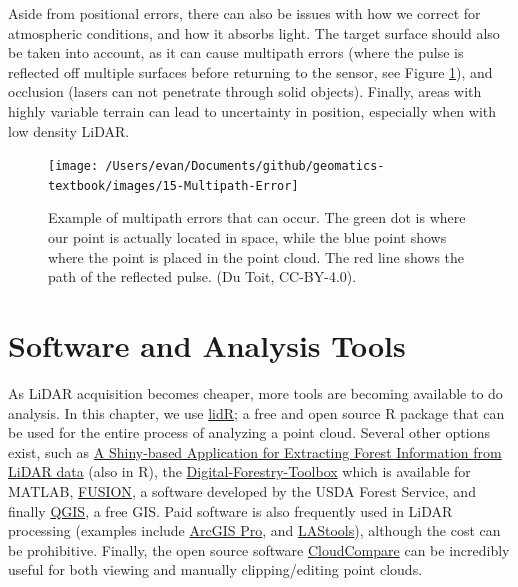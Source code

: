 \documentclass[
]{book}
\begin{document}
Aside from positional errors, there can also be issues with how we correct for atmospheric conditions, and how it absorbs light. The target surface should also be taken into account, as it can cause multipath errors (where the pulse is reflected off multiple surfaces before returning to the sensor, see Figure \ref{fig:15-multipath-error}), and occlusion (lasers can not penetrate through solid objects). Finally, areas with highly variable terrain can lead to uncertainty in position, especially when with low density LiDAR.

\begin{figure}
\texttt{[image: /Users/evan/Documents/github/geomatics-textbook/images/15-Multipath-Error]} \caption{Example of multipath errors that can occur. The green dot is where our point is actually located in space, while the blue point shows where the point is placed in the point cloud. The red line shows the path of the reflected pulse. (Du Toit, CC-BY-4.0).}\label{fig:15-multipath-error}
\end{figure}

\hypertarget{software-and-analysis-tools}{%
\section{Software and Analysis Tools}\label{software-and-analysis-tools}}

As LiDAR acquisition becomes cheaper, more tools are becoming available to do analysis. In this chapter, we use \href{https://cran.r-project.org/web/packages/lidR/}{lidR}; a free and open source R package that can be used for the entire process of analyzing a point cloud. Several other options exist, such as \href{https://github.com/carlos-alberto-silva/weblidar-treetop}{A Shiny-based Application for Extracting Forest Information from LiDAR data} (also in R), the \href{http://mparkan.github.io/Digital-Forestry-Toolbox/}{Digital-Forestry-Toolbox} which is available for MATLAB, \href{http://forsys.cfr.washington.edu/fusion/fusion_overview.html}{FUSION}, a software developed by the USDA Forest Service, and finally \href{https://www.qgis.org/en/site/}{QGIS}, a free GIS. Paid software is also frequently used in LiDAR processing (examples include \href{https://www.esri.com/en-us/home}{ArcGIS Pro}, and \href{https://rapidlasso.com/lastools/}{LAStools}), although the cost can be prohibitive. Finally, the open source software \href{https://www.danielgm.net/cc/}{CloudCompare} can be incredibly useful for both viewing and manually clipping/editing point clouds.
\end{document}
